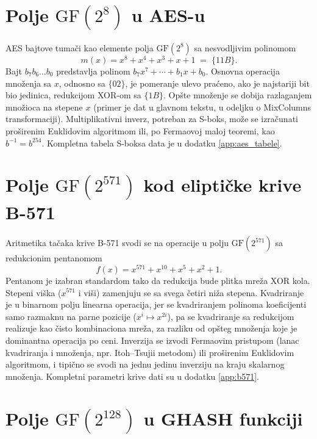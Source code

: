 \section{Polje \texorpdfstring{$\mathrm{GF}(2^8)$}{GF(2\^{}8)} u AES-u}
\label{app:gf256}

AES bajtove tumači kao elemente polja $\mathrm{GF}(2^8)$ sa nesvodljivim polinomom
\begin{equation}
    m(x) = x^8 + x^4 + x^3 + x + 1 \;=\; \{11B\}.
\end{equation}
Bajt $b_7 b_6 \ldots b_0$ predstavlja polinom $b_7 x^7 + \cdots + b_1 x + b_0$. Osnovna operacija množenja sa $x$, odnosno sa $\{02\}$, je pomeranje ulevo praćeno, ako je najstariji bit bio jedinica, redukcijom XOR-om sa $\{1B\}$. Opšte množenje se dobija razlaganjem množioca na stepene $x$ (primer je dat u glavnom tekstu, u odeljku o MixColumns transformaciji). Multiplikativni inverz, potreban za S-boks, može se izračunati proširenim Euklidovim algoritmom ili, po Fermaovoj maloj teoremi, kao $b^{-1} = b^{254}$. Kompletna tabela S-boksa data je u dodatku \ref{app:aes_tabele}.

\section{Polje \texorpdfstring{$\mathrm{GF}(2^{571})$}{GF(2\^{}571)} kod eliptičke krive B-571}
\label{app:gf571}

Aritmetika tačaka krive B-571 svodi se na operacije u polju $\mathrm{GF}(2^{571})$ sa redukcionim pentanomom
\begin{equation}
    f(x) = x^{571} + x^{10} + x^5 + x^2 + 1.
\end{equation}
Pentanom je izabran standardom tako da redukcija bude plitka mreža XOR kola. Stepeni viška ($x^{571}$ i viši) zamenjuju se sa svega četiri niža stepena. Kvadriranje je u binarnom polju linearna operacija, jer se kvadriranjem polinoma koeficijenti samo razmaknu na parne pozicije ($x^i \mapsto x^{2i}$), pa se kvadriranje sa redukcijom realizuje kao čisto kombinaciona mreža, za razliku od opšteg množenja koje je dominantna operacija po ceni. Inverzija se izvodi Fermaovim pristupom (lanac kvadriranja i množenja, npr. Itoh--Tsujii metodom) ili proširenim Euklidovim algoritmom, i tipično se svodi na jednu jedinu inverziju na kraju skalarnog množenja. Kompletni parametri krive dati su u dodatku \ref{app:b571}.

\section{Polje \texorpdfstring{$\mathrm{GF}(2^{128})$}{GF(2\^{}128)} u GHASH funkciji}
\label{app:gf128}

